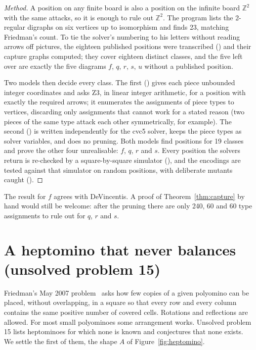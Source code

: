 \documentclass[11pt]{amsart}
\theoremstyle{remark}
\begin{document}
\begin{proof}[Method]
A position on any finite board is also a position on the infinite board $\mathbb Z^2$ with the same
attacks, so it is enough to rule out $\mathbb Z^2$. The program  lists the
2-regular digraphs on six vertices up to isomorphism and finds 23, matching Friedman's count. To tie
the solver's numbering to his letters without reading arrows off pictures, the eighteen published
positions were transcribed () and their capture graphs
computed; they cover eighteen distinct classes, and the five left over are exactly the five diagrams
$f$, $q$, $r$, $s$, $u$ without a published position.

Two models then decide every class. The first () gives each piece unbounded
integer coordinates and asks Z3, in linear integer arithmetic, for a position with exactly the
required arrows; it enumerates the assignments of piece types to vertices, discarding only
assignments that cannot work for a stated reason (two pieces of the same type attack each other
symmetrically, for example). The second () is written independently for
the cvc5 solver, keeps the piece types as solver variables, and does no pruning. Both models find
positions for 19 classes and prove the other four unrealisable: $f$, $q$, $r$ and $s$. Every
position the solvers return is re-checked by a square-by-square simulator (),
and the encodings are tested against that simulator on random positions, with deliberate mutants
caught ().
\end{proof}

The result for $f$ agrees with DeVincentis. A proof of Theorem~\ref{thm:capture} by hand would still
be welcome: after the pruning there are only 240, 60 and 60 type assignments to rule out for $q$,
$r$ and $s$.

\section{A heptomino that never balances (unsolved problem 15)}\label{sec:heptomino}

Friedman's May 2007 problem~\cite{polyomino} asks how few copies of a given polyomino can be placed,
without overlapping, in a square so that every row and every column contains the same positive number
of covered cells. Rotations and reflections are allowed. For most small polyominoes some arrangement
works. Unsolved problem 15 lists heptominoes for which none is known and conjectures that none exists.
We settle the first of them, the shape $A$ of Figure~\ref{fig:heptomino}.
\end{document}
